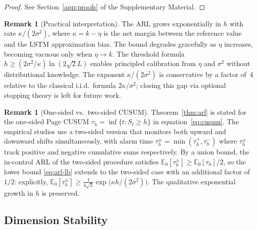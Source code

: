 \documentclass[bj,authoryear]{imsart}
\theoremstyle{plain}
\theoremstyle{definition}
\newtheorem{remark}[theorem]{Remark}
\newcommand{\E}{\mathbb{E}}
\begin{document}
\begin{proof}
  See Section~\ref{app:proofs} of the Supplementary Material.
\end{proof}

\begin{remark}[Practical interpretation]
  The ARL grows exponentially in $h$ with rate $\kappa/(2\sigma^2)$,
  where $\kappa=k-\eta$ is the net margin between the reference value
  and the LSTM approximation bias.
  The bound degrades gracefully as $\eta$ increases, becoming vacuous
  only when $\eta\to k$.
  The threshold formula $h\geq(2\sigma^2/\kappa)\ln(2\sqrt{2}L)$
  enables principled calibration from $\eta$ and $\sigma^2$ without
  distributional knowledge.
  The exponent $\kappa/(2\sigma^2)$ is conservative by a factor of~4
  relative to the classical i.i.d.\ formula $2\kappa/\sigma^2$; closing
  this gap via optional stopping theory is left for future work.
\end{remark}

\begin{remark}[One-sided vs.\ two-sided CUSUM]
\label{rem:twosided}
  Theorem~\ref{thm:arl} is stated for the one-sided Page CUSUM
  $\tau_h = \inf\{t: S_t \geq h\}$ in equation~\eqref{eq:cusum}.
  The empirical studies use a two-sided version that monitors both upward
  and downward shifts simultaneously, with alarm time
  $\tau_h^{\pm} = \min(\tau_h^+, \tau_h^-)$ where $\tau_h^\pm$ track
  positive and negative cumulative sums respectively.  By a union bound,
  the in-control ARL of the two-sided procedure satisfies
  $\E_0[\tau_h^{\pm}] \geq \E_0[\tau_h]/2$, so the lower bound
  \eqref{eq:arl-lb} extends to the two-sided case with an additional
  factor of $1/2$: explicitly,
  $\E_0[\tau_h^{\pm}] \geq \frac{1}{4\sqrt{2}}\exp\!\bigl(\kappa h/(2\sigma^2)\bigr)$.
  The qualitative exponential growth in $h$ is preserved.
\end{remark}

\subsection{Dimension Stability}
\end{document}
